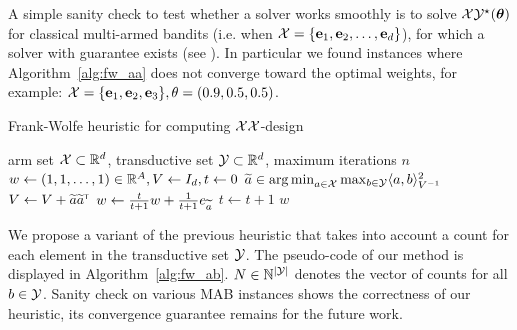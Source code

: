 A simple sanity check to test whether a solver works smoothly is  to solve $\mathcal{X}\mathcal{Y}^\star({\boldsymbol \theta})$ for classical multi-armed bandits (i.e. when $\mathcal{X}= \{{\bf e}_1,{\bf e}_2,\ldots,{\bf e}_d\}$), for which a solver with guarantee exists (see \citealt{garivier2018explore}). In particular we found instances where Algorithm~\ref{alg:fw_aa} does not converge toward the optimal weights, for example: $\mathcal{X}= \{{\bf e}_1,{\bf e}_2,{\bf e}_3\}, \theta = (0.9, 0.5, 0.5)$.



\begin{algorithm}[ht]
\centering
\caption{Frank-Wolfe heuristic for computing $\mathcal{X}\mathcal{X}$-design}
\label{alg:fw_aa}
\begin{algorithmic}
    arm set $\mathcal{X}\subset\mathbb{R}^d$, transductive set $\mathcal{Y}\subset\mathbb{R}^d$, maximum iterations $n$
    $w \leftarrow{} (1, 1, \ldots, 1)\in\mathbb{R}^A, V \leftarrow{} I_d, t \leftarrow{} 0$
        \State $\widetilde{a}\in\operatorname*{arg\,min}_{a\in\mathcal{X}}\max_{b\in\mathcal{Y}}\langle a,b\rangle_{V^{-1}}^2$%
        \State $V \leftarrow{} V + \widetilde{a} \widetilde{a}^{\mathsf{\scriptscriptstyle T}}$
        \State $w \leftarrow{} \frac{t}{t+1}w+\frac{1}{t+1}e_{\widetilde{a}}$
        \State $t \leftarrow{} t+1$
   \EndWhile
    $w$
\end{algorithmic}
\end{algorithm}

We propose a variant of the previous heuristic that takes into account a count for each element in the transductive set $\mathcal{Y}$. The pseudo-code of our method is displayed in Algorithm~\ref{alg:fw_ab}. $N\in{\mathbb N}^{|\mathcal{Y}|}$ denotes the vector of counts for all $b\in\mathcal{Y}$. Sanity check on various MAB instances shows the correctness of our heuristic, its convergence guarantee remains for the future work.

